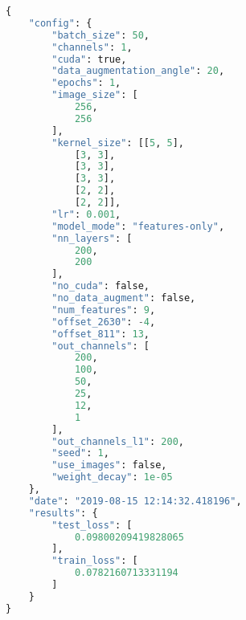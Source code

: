 \begin{lstlisting}[language=Python, basicstyle=\footnotesize, keywordstyle=\color{deepblue}, emphstyle=\color{deepred}, stringstyle=\color{deepgreen}]
{
    "config": {
        "batch_size": 50,
        "channels": 1,
        "cuda": true,
        "data_augmentation_angle": 20,
        "epochs": 1,
        "image_size": [
            256,
            256
        ],
        "kernel_size": [[5, 5],
            [3, 3],
            [3, 3],
            [3, 3],
            [2, 2],
            [2, 2]],
        "lr": 0.001,
        "model_mode": "features-only",
        "nn_layers": [
            200,
            200
        ],
        "no_cuda": false,
        "no_data_augment": false,
        "num_features": 9,
        "offset_2630": -4,
        "offset_811": 13,
        "out_channels": [
            200,
            100,
            50,
            25,
            12,
            1
        ],
        "out_channels_l1": 200,
        "seed": 1,
        "use_images": false,
        "weight_decay": 1e-05
    },
    "date": "2019-08-15 12:14:32.418196",
    "results": {
        "test_loss": [
            0.09800209419828065
        ],
        "train_loss": [
            0.0782160713331194
        ]
    }
}
\end{lstlisting}
